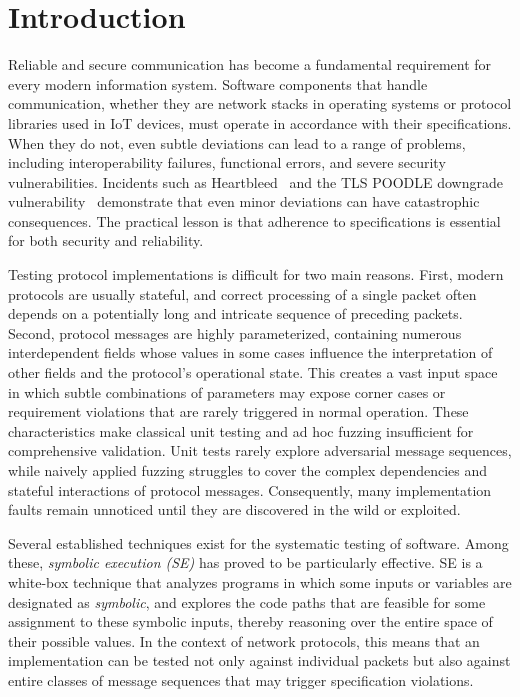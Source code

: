 \chapter{Introduction}
Reliable and secure communication has become a fundamental requirement for every modern information system.
Software components that handle communication, whether they are network stacks in operating systems or protocol libraries used in IoT devices, must operate in accordance with their specifications.
When they do not, even subtle deviations can lead to a range of problems, including interoperability failures, functional errors, and severe security vulnerabilities.
Incidents such as Heartbleed~\cite{heartbleed} and the TLS POODLE downgrade vulnerability~\cite{POODLE, poodle-bites-tls} demonstrate that even minor deviations can have catastrophic consequences.
The practical lesson is that adherence to specifications is essential for both security and reliability.

Testing protocol implementations is difficult for two main reasons. 
First, modern protocols are usually stateful, and correct processing of a single packet often depends on a potentially long and intricate sequence of preceding packets.
Second, protocol messages are highly parameterized, containing numerous interdependent fields whose values in some cases influence the interpretation of other fields and the protocol's operational state.
This creates a vast input space in which subtle combinations of parameters may expose corner cases or requirement violations that are rarely triggered in normal operation.
These characteristics make classical unit testing and ad hoc fuzzing insufficient for comprehensive validation.
Unit tests rarely explore adversarial message sequences, while naively applied fuzzing struggles to cover the complex dependencies and stateful interactions of protocol messages.
Consequently, many implementation faults remain unnoticed until they are discovered in the wild or exploited.

Several established techniques exist for the systematic testing of software.
Among these, \emph{symbolic execution (SE)} has proved to be particularly effective.
SE is a white-box technique that analyzes programs in which some inputs or variables
are designated as \emph{symbolic}, and explores the code paths that are
feasible for some assignment to these symbolic inputs, thereby reasoning over the entire space of their possible values.
In the context of network protocols, this means that an implementation can be tested not only against individual packets but also against entire classes of message sequences that may trigger specification violations.

